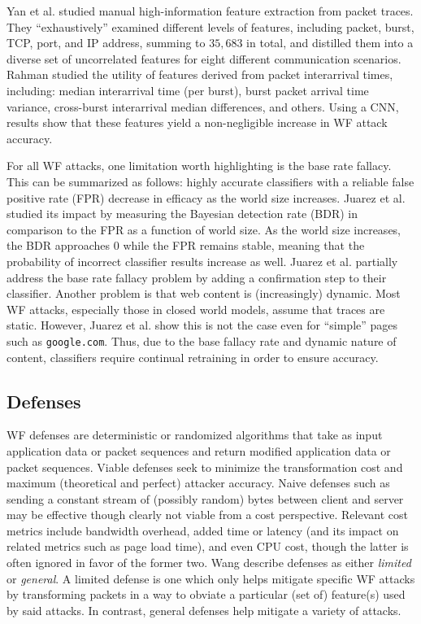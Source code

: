 \documentclass[runningheads]{llncs}
\begin{document}
Yan et al. \cite{yan2018feature} studied manual high-information feature extraction from packet traces.
They ``exhaustively'' examined different levels of features, including packet, burst, TCP, port, and IP address,
summing to $35,683$ in total, and distilled them into a diverse set of uncorrelated features for eight
different communication scenarios. Rahman \cite{rahman2018using} studied the utility of features derived
from packet interarrival times, including: median interarrival time (per burst), burst packet arrival
time variance, cross-burst interarrival median differences, and others. Using a CNN, results show that
these features yield a non-negligible increase in WF attack accuracy.

For all WF attacks, one limitation worth highlighting is the base rate fallacy. This can be summarized
as follows: highly accurate classifiers with a reliable false positive rate (FPR) decrease in
efficacy as the world size increases. Juarez et al. \cite{juarez2014critical} studied its impact by
measuring the Bayesian detection rate (BDR) in comparison to the FPR as a function of world size.
As the world size increases, the BDR approaches $0$ while the FPR remains stable, meaning that the probability
of incorrect classifier results increase as well. Juarez et al. partially address the base rate fallacy
problem by adding a confirmation step to their classifier.
Another problem is that web content is (increasingly) dynamic. Most WF attacks, especially those in closed
world models, assume that traces are static. However, Juarez et al. \cite{juarez2014critical} show
this is not the case even for ``simple'' pages such as {\tt google.com}. Thus, due to the base fallacy
rate and dynamic nature of content, classifiers require continual retraining in order to ensure accuracy.

\subsection{Defenses} \label{sec:defenses}
WF defenses are deterministic or randomized algorithms that take as input application data or packet sequences
and return modified application data or packet sequences. Viable defenses seek to minimize the transformation
cost and maximum (theoretical and perfect) attacker accuracy. Naive defenses such as sending a constant stream
of (possibly random) bytes between client and server may be effective though clearly not viable from a cost
perspective. Relevant cost metrics include bandwidth overhead, added time or latency (and its impact on related
metrics such as page load time), and even CPU cost, though the latter is often ignored in favor of the former two.
Wang \cite{wang2016website} describe defenses as either \emph{limited} or \emph{general}. A limited defense is
one which only helps mitigate specific WF attacks by transforming packets in a way to obviate a particular
(set of) feature(s) used by said attacks. In contrast, general defenses help mitigate a variety of attacks.
\end{document}
